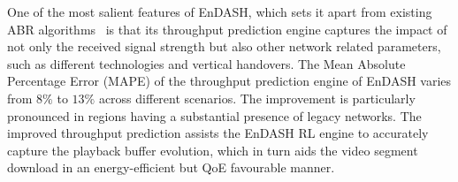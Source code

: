 One of the most salient features of EnDASH, which sets it apart from existing \ac{ABR} algorithms~\cite{mao2017neural,Spiteri2016,Sengupta2018,Yin2015,Raca2019,Akhtar2018,Schulman2010} is that its throughput prediction engine captures the impact of not only the received signal strength but also other network related parameters, such as different technologies and vertical handovers. 
The Mean Absolute Percentage Error (MAPE) of the throughput prediction engine of EnDASH varies from $8\%$ to $13\%$ across different scenarios. The improvement is particularly pronounced in regions having a substantial presence of legacy networks. %
The improved throughput prediction assists the EnDASH RL engine to accurately capture the playback buffer evolution, which in turn aids the video segment download in an energy-efficient but QoE favourable manner.\vspace*{-0.2cm}

